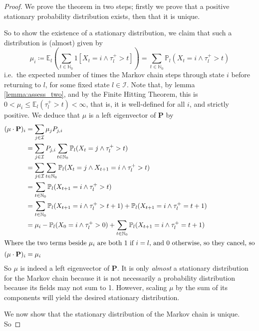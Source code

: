 			\begin{proof}
				We prove the theorem in two steps; firstly we prove that a positive stationary
				probability distribution exists, then that it is unique. \par
				So to show the existence of a stationary distribution, we claim that such a 
				distribution is (almost) given by 
				$$
					\mu_i \coloneqq \mathbb{E}_l\left(\sum_{t \in \mathbb{N}_0}
						1[X_t = i \land \tau_l^+>t] 
					\right)
					= \sum_{t \in \mathbb{N}_0} \mathbb{P}_l(X_t = i \land \tau_l^+>t)
				$$
				i.e.\ the expected number of times the Markov chain steps through state $i$
				before returning to $l$, for some fixed state $l \in \mathcal{I}$.
				Note that, by lemma \ref{lemma:assess_two}, and by the Finite Hitting Theorem,
				this is $0 < \mu_i \leq \mathbb{E}_l(\tau_l^+>t) < \infty$, that is, it is 
				well-defined for all $i$, and strictly positive. We deduce that $\mu$ is a left
				eigenvector of $\mathbf{P}$ by
				\begin{align*}
					(\mu\cdot\mathbf{P})_i &= \sum_{j \in \mathcal{I}} \mu_j P_{j,i} \\
					&= \sum_{j \in \mathcal{I}} P_{j,i} \sum_{t \in \mathbb{N}_0}
					\mathbb{P}_l(X_t = j \land \tau_l^+>t) \\
					&= \sum_{j \in \mathcal{I}}\sum_{t \in \mathbb{N}_0}
					\mathbb{P}_l(X_t = j \land X_{t+1} = i \land \tau_l^+>t) \\
					&= \sum_{t \in \mathbb{N}_0}
					\mathbb{P}_l(X_{t+1} = i \land \tau_l^+>t) \\
					&= \sum_{t \in \mathbb{N}_0}
					\mathbb{P}_l(X_{t+1} = i \land \tau_l^+>t+1) + 
					\mathbb{P}_l(X_{t+1} = i \land \tau_l^+=t+1)  \\
					&= \mu_i - \mathbb{P}_l(X_0=i \land \tau_l^+>0) +
					\sum_{t \in \mathbb{N}_0}
					\mathbb{P}_l(X_{t+1} = i \land \tau_l^+=t+1)  \\
				\intertext{Where the two terms beside $\mu_i$ are both $1$ if $i = l$, and $0$ 
				otherwise, so they cancel, so}
					(\mu\cdot\mathbf{P})_i &= \mu_i
				\end{align*}
				So $\mu$ is indeed a left eigenvector of $\mathbf{P}$. It is only \emph{almost} 
				a stationary distribution for the Markov chain because it is not necessarily a 
				probability distribution because its fields may not sum to 1. However, scaling 
				$\mu$ by the sum of its components will yield the desired stationary distribution.
				\par
				We now show that the stationary distribution of the Markov chain is unique. So

\end{proof}
